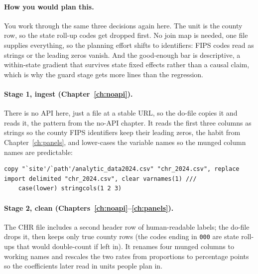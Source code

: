 \documentclass[
    a4paper,
    fontsize=10pt,
    twoside=true,
    numbers=noenddot,
]{kaobook}
\begin{document}
\paragraph{How you would plan this.} You work through the same three decisions again here. The unit is the county row, so the state roll-up codes get dropped first. No join map is needed, one file supplies everything, so the planning effort shifts to identifiers: FIPS codes read as strings or the leading zeros vanish. And the good-enough bar is descriptive, a within-state gradient that survives state fixed effects rather than a causal claim, which is why the guard stage gets more lines than the regression.

\paragraph{Stage 1, ingest (Chapter~\ref{ch:noapi}).} There is no API here, just a file at a stable URL, so the do-file copies it and reads it, the pattern from the no-API chapter. It reads the first three columns as strings so the county FIPS identifiers keep their leading zeros, the habit from Chapter~\ref{ch:panels}, and lower-cases the variable names so the munged column names are predictable:
\par
{\footnotesize
\begin{verbatim}
copy "`site'/`path'/analytic_data2024.csv" "chr_2024.csv", replace
import delimited "chr_2024.csv", clear varnames(1) ///
    case(lower) stringcols(1 2 3)
\end{verbatim}
}

\paragraph{Stage 2, clean (Chapters~\ref{ch:noapi}--\ref{ch:panels}).} The CHR file includes a second header row of human-readable labels; the do-file drops it, then keeps only true county rows (the codes ending in \texttt{000} are state roll-ups that would double-count if left in). It renames four munged columns to working names and rescales the two rates from proportions to percentage points so the coefficients later read in units people plan in.
\end{document}
